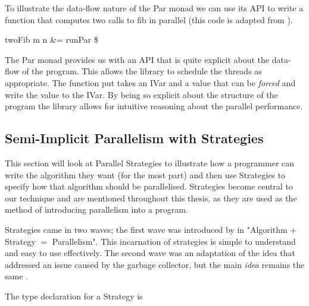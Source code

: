 To illustrate the data-flow nature of the \<Par\> monad we can use its API to
write a function that computes two calls to \<fib\> in parallel (this code is
adapted from \citet[pg. 59]{marlowBook}).

\begin{haskell}
twoFib m n &= runPar \$ 
\end{haskell}

The \<Par\> monad provides us with an API that is quite explicit about the
data-flow of the program. This allows the library to schedule the threads
as appropriate. The function \<put\> takes an \<IVar\> and a value that
can be \emph{forced} and write the value to the \<IVar\>. By being
so explicit about the structure of the program the library allows for
intuitive reasoning about the parallel performance.


\subsection{Semi-Implicit Parallelism with Strategies}

This section will look at Parallel Strategies to illustrate how a programmer
can write the algorithm they want (for the most part) and then use Strategies
to specify how that algorithm should be parallelised. Strategies become central
to our technique and are mentioned throughout this thesis, as they are used as
the method of introducing parallelism into a program.

Strategies came in two waves; the first wave was introduced by
\citet{strategies} in "Algorithm \(+\) Strategy \(=\) Parallelism". This
incarnation of strategies is simple to understand and easy to use effectively.
The second wave was an adaptation of the idea that addressed an issue caused by
the garbage collector, but the main \emph{idea} remains the same
\citep{marlow2010seq}.

The type declaration for a Strategy is

